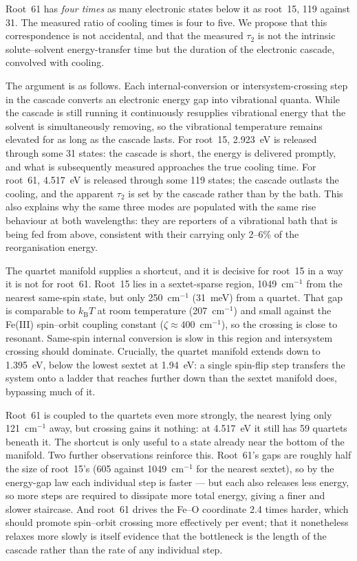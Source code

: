 \documentclass[11pt,a4paper]{article}
\newcommand{\wn}{\ensuremath{\mathrm{cm^{-1}}}}
\begin{document}
Root~61 has \emph{four times} as many electronic states below it as root~15,
119 against 31. The measured ratio of cooling times is four to five. We
propose that this correspondence is not accidental, and that the measured
$\tau_2$ is not the intrinsic solute--solvent energy-transfer time but the
duration of the electronic cascade, convolved with cooling.

The argument is as follows. Each internal-conversion or intersystem-crossing
step in the cascade converts an electronic energy gap into vibrational quanta.
While the cascade is still running it continuously resupplies vibrational
energy that the solvent is simultaneously removing, so the vibrational
temperature remains elevated for as long as the cascade lasts. For root~15,
2.923~eV is released through some 31 states: the cascade is short, the energy
is delivered promptly, and what is subsequently measured approaches the true
cooling time. For root~61, 4.517~eV is released through some 119 states; the
cascade outlasts the cooling, and the apparent $\tau_2$ is set by the cascade
rather than by the bath. This also explains why the same three modes are
populated with the same rise behaviour at both wavelengths: they are reporters
of a vibrational bath that is being fed from above, consistent with their
carrying only 2--6\% of the reorganisation energy.

The quartet manifold supplies a shortcut, and it is decisive for root~15 in a
way it is not for root~61. Root~15 lies in a sextet-sparse region, 1049~\wn{}
from the nearest same-spin state, but only 250~\wn{} (31~meV) from a quartet.
That gap is comparable to $k_{\mathrm{B}}T$ at room temperature (207~\wn{})
and small against the Fe(III) spin--orbit coupling constant
($\zeta \approx 400$~\wn{}), so the crossing is close to resonant.
Same-spin internal conversion is slow in this region and intersystem crossing
should dominate. Crucially, the quartet manifold extends down to 1.395~eV,
below the lowest sextet at 1.94~eV: a single spin-flip step transfers the
system onto a ladder that reaches further down than the sextet manifold does,
bypassing much of it.

Root~61 is coupled to the quartets even more strongly, the nearest lying only
121~\wn{} away, but crossing gains it nothing: at 4.517~eV it still has 59
quartets beneath it. The shortcut is only useful to a state already near the
bottom of the manifold. Two further observations reinforce this. Root~61's
gaps are roughly half the size of root~15's (605 against 1049~\wn{} for the
nearest sextet), so by the energy-gap law each individual step is faster --- but
each also releases less energy, so more steps are required to dissipate more
total energy, giving a finer and slower staircase. And root~61 drives the
Fe--O coordinate 2.4 times harder, which should promote spin--orbit crossing
more effectively per event; that it nonetheless relaxes more slowly is itself
evidence that the bottleneck is the length of the cascade rather than the rate
of any individual step.
\end{document}
